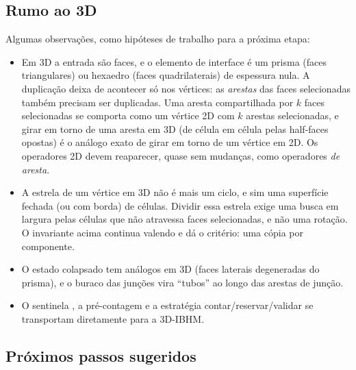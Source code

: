 \subsection{Rumo ao 3D}
\label{sec:3d}

Algumas observações, como hipóteses de trabalho para a próxima etapa:
\begin{itemize}
\item Em 3D a entrada são faces, e o elemento de interface é um prisma (faces triangulares) ou hexaedro (faces
quadrilaterais) de espessura nula. A duplicação deixa de acontecer só nos vértices: as \emph{arestas} das faces
selecionadas também precisam ser duplicadas. Uma aresta compartilhada por $k$ faces selecionadas se comporta como um
vértice 2D com $k$ arestas selecionadas, e girar em torno de uma aresta em 3D (de célula em célula pelas half-faces
opostas) é o análogo exato de girar em torno de um vértice em 2D. Os operadores 2D devem reaparecer, quase sem
mudanças, como operadores \emph{de aresta}.
\item A estrela de um vértice em 3D não é mais um ciclo, e sim uma superfície fechada (ou com borda) de células. Dividir
essa estrela exige uma busca em largura pelas células que não atravessa faces selecionadas, e não uma rotação. O
invariante acima continua valendo e dá o critério: uma cópia por componente.
\item O estado colapsado tem análogos em 3D (faces laterais degeneradas do prisma), e o buraco das junções vira
``tubos'' ao longo das arestas de junção.
\item O sentinela \COLLAPSED, a pré-contagem e a estratégia contar/reservar/validar se transportam diretamente para a
3D-IBHM.
\end{itemize}

\subsection{Próximos passos sugeridos}

